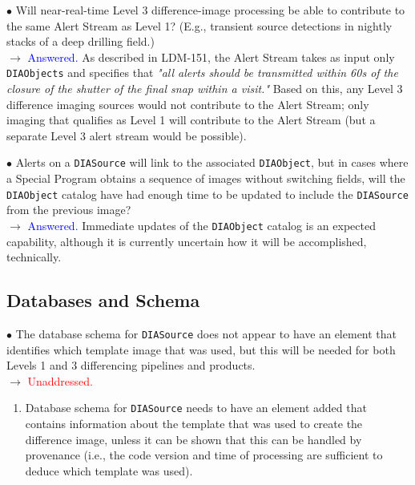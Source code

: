 \documentclass[DM,lsstdraft,toc]{lsstdoc}
\begin{document}
$\bullet$ Will near-real-time Level 3 difference-image processing be able to contribute to the same Alert Stream as Level 1? (E.g., transient source detections in nightly stacks of a deep drilling field.) \\
$\rightarrow$ \textcolor{blue}{Answered.} As described in LDM-151, the Alert Stream takes as input only {\tt DIAObjects} and specifies that {\it "all alerts should be transmitted within 60s of the closure of the shutter of the final snap within a visit."} Based on this, any Level 3 difference imaging sources would not contribute to the Alert Stream; only imaging that qualifies as Level 1 will contribute to the Alert Stream (but a separate Level 3 alert stream would be possible).

$\bullet$ Alerts on a {\tt DIASource} will link to the associated {\tt DIAObject}, but in cases where a Special Program obtains a sequence of images without switching fields, will the {\tt DIAObject} catalog have had enough time to be updated to include the {\tt DIASource} from the previous image? \\
$\rightarrow$  \textcolor{blue}{Answered.} Immediate updates of the {\tt DIAObject} catalog is an expected capability, although it is currently uncertain how it will be accomplished, technically. 


\subsection{Databases and Schema}\label{ssec:issues_databases}

$\bullet$ The database schema for {\tt DIASource} does not appear to have an element that identifies which template image that was used, but this will be needed for both Levels 1 and 3 differencing pipelines and products. \\
$\rightarrow$ \textcolor{red}{Unaddressed.}
\begin{enumerate}[resume,topsep=-10pt,label= \textbf{Concern \Roman*.}] \item \label{C8} Database schema for {\tt DIASource} needs to have an element added that contains information about the template that was used to create the difference image, unless it can be shown that this can be handled by provenance (i.e., the code version and time of processing are sufficient to deduce which template was used). \end{enumerate}
\end{document}

